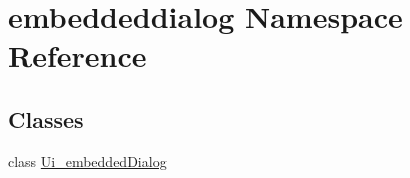 \hypertarget{namespaceembeddeddialog}{}\section{embeddeddialog Namespace Reference}
\label{namespaceembeddeddialog}
\subsection*{Classes}
\begin{DoxyCompactItemize}
\item 
class \hyperlink{classembeddeddialog_1_1Ui__embeddedDialog}{Ui\+\_\+embedded\+Dialog}
\end{DoxyCompactItemize}
